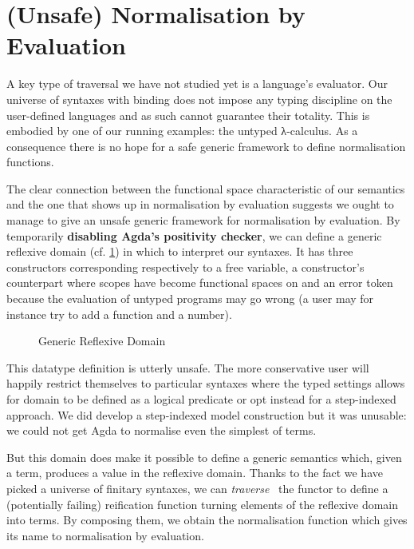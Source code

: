 \section{(Unsafe) Normalisation by Evaluation}\label{section:unsafenbyeval}

A key type of traversal we have not studied yet is a language's
evaluator. Our universe of syntaxes with binding does not impose
any typing discipline on the user-defined languages and as such
cannot guarantee their totality. This is embodied by one of our running
examples: the untyped λ-calculus. As a consequence there
is no hope for a safe generic framework to define normalisation
functions.

The clear connection between the  functional space
characteristic of our semantics and the one that shows up in
normalisation by evaluation suggests we ought to manage to
give an unsafe generic framework for normalisation by evaluation.
By temporarily \textbf{disabling Agda's positivity checker},
we can define a generic reflexive domain 
(cf. \cref{fig:reflexivedomain}) in which to
interpret our syntaxes. It has three constructors corresponding
respectively to a free variable, a constructor's counterpart where
scopes have become  functional spaces on  and
an error token because the evaluation of untyped programs may go wrong
(a user may for instance try to add a function and a number).

\begin{figure}[h]
\caption{Generic Reflexive Domain}\label{fig:reflexivedomain}
\end{figure}

This datatype definition is utterly unsafe. The more conservative
user will happily restrict themselves to particular syntaxes where
the typed settings allows for domain to be defined as a logical
predicate or opt instead for a step-indexed approach. We did develop
a step-indexed model construction but it was unusable: we could not
get Agda to normalise even the simplest of terms.

But this domain does make it possible to define a generic 
semantics which, given a term, produces a value in the reflexive
domain. Thanks to the fact we have picked a universe of finitary syntaxes, we
can \emph{traverse}~\cite{mcbride_paterson_2008,DBLP:journals/jfp/GibbonsO09}
the functor to define
a (potentially failing) reification function turning elements of the
reflexive domain into terms. By composing them, we obtain the
normalisation function which gives its name to normalisation by
evaluation.

